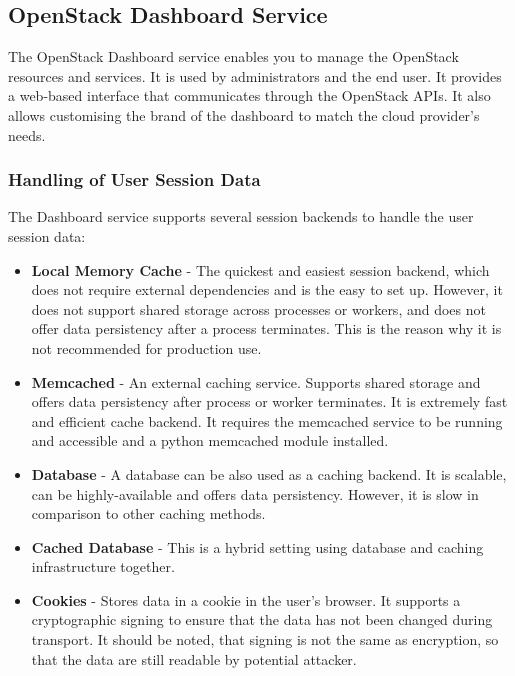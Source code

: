 \subsection{OpenStack Dashboard Service}
The OpenStack Dashboard service enables you to manage the OpenStack resources and services. It is used by administrators and the end user. It provides a web-based interface that communicates through the OpenStack APIs. It also allows customising the brand of the dashboard to match the cloud provider's needs. \cite{InstallGuide}

\subsubsection*{Handling of User Session Data}

The Dashboard service supports several session backends to handle the user session data:
\begin{itemize}
  \item{\textbf{Local Memory Cache} - The quickest and easiest session backend, which does not require external dependencies and is the easy to set up. However, it does not support shared storage across processes or workers, and does not offer data persistency after a process terminates. This is the reason why it is not recommended for production use.}
  \item{\textbf{Memcached} - An external caching service. Supports shared storage and offers data persistency after process or worker terminates. It is extremely fast and efficient cache backend. It requires the memcached service to be running and accessible and a python memcached module installed.}
  \item{\textbf{Database} - A database can be also used as a caching backend. It is scalable, can be highly-available and offers data persistency. However, it is slow in comparison to other caching methods.}
  \item{\textbf{Cached Database} - This is a hybrid setting using database and caching infrastructure together.}
  \item{\textbf{Cookies} - Stores data in a cookie in the user's browser. It supports a cryptographic signing to ensure that the data has not been changed during transport. It should be noted, that signing is not the same as encryption, so that the data are still readable by potential attacker.}
  \\\cite{DeployingHorizon}
\end{itemize}
